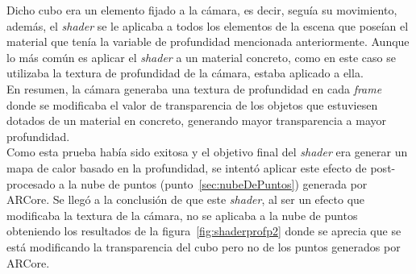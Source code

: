Dicho cubo era un elemento fijado a la cámara, es decir, seguía su movimiento, además, el \textit{shader} se le aplicaba a todos los elementos de la escena que poseían el material que tenía la variable de profundidad mencionada anteriormente. Aunque lo más común es aplicar el \textit{shader} a un material concreto, como en este caso se utilizaba la textura de profundidad de la cámara, estaba aplicado a ella.\\

En resumen, la cámara generaba una textura de profundidad en cada \textit{frame} donde se modificaba el valor de transparencia de los objetos que estuviesen dotados de un material en concreto, generando mayor transparencia a mayor profundidad.\\


Como esta prueba había sido exitosa y el objetivo final del \textit{shader} era generar un mapa de calor basado en la profundidad, se intentó aplicar este efecto de post-procesado a la nube de puntos (punto~\ref{sec:nubeDePuntos}) generada por ARCore. Se llegó a la conclusión de que este \textit{shader}, al ser un efecto que modificaba la textura de la cámara, no se aplicaba a la nube de puntos obteniendo los resultados de la figura~\ref{fig:shaderprofp2} donde se aprecia que se está modificando la transparencia del cubo pero no de los puntos generados por ARCore.

